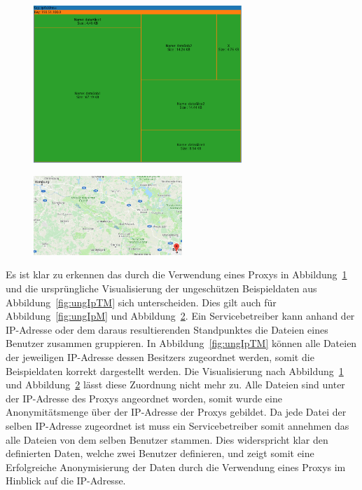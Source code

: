 \documentclass[
    fontsize=12pt,
    headings=small,
    parskip=half,           %
    bibliography=totoc,
    numbers=noenddot,       %
    open=any,               %
    ]{scrreprt}
\begin{document}
\begin{figure}[H]
\includegraphics[width=0.7\textwidth]{../pic/IP-Proxy-SetB-tree3.PNG}
\label{fig:PIpTM}
\end{figure}

\begin{figure}[H]
\includegraphics[width=0.5\textwidth , height=0.2\textheight]{../pic/IP-Proxy-SetB.PNG}
\label{fig:PIpM}
\end{figure}

Es ist klar zu erkennen das durch die Verwendung eines Proxys in Abbildung~\ref{fig:PIpTM} und die ursprüngliche Visualisierung der ungeschützen Beispieldaten aus Abbildung~\ref{fig:ungIpTM} sich unterscheiden. 
Dies gilt auch für Abbildung~\ref{fig:ungIpM} und Abbildung~\ref{fig:PIpM}.
Ein Servicebetreiber kann anhand der IP-Adresse oder dem daraus resultierenden Standpunktes die Dateien eines Benutzer zusammen gruppieren.
In Abbildung~\ref{fig:ungIpTM} können alle Dateien der jeweiligen IP-Adresse dessen Besitzers zugeordnet werden, somit die Beispieldaten korrekt dargestellt werden.
Die Visualisierung nach Abbildung~\ref{fig:PIpTM} und Abbildung~\ref{fig:PIpM} lässt diese Zuordnung nicht mehr zu. 
Alle Dateien sind unter der IP-Adresse des Proxys angeordnet worden, somit wurde eine Anonymitätsmenge über der IP-Adresse der Proxys gebildet.
Da jede Datei der selben IP-Adresse zugeordnet ist muss ein Servicebetreiber somit annehmen das alle Dateien von dem selben Benutzer stammen.
Dies widerspricht klar den definierten Daten, welche zwei Benutzer definieren, und zeigt somit eine Erfolgreiche Anonymisierung der Daten durch die Verwendung eines Proxys im Hinblick auf die IP-Adresse.
\end{document}
